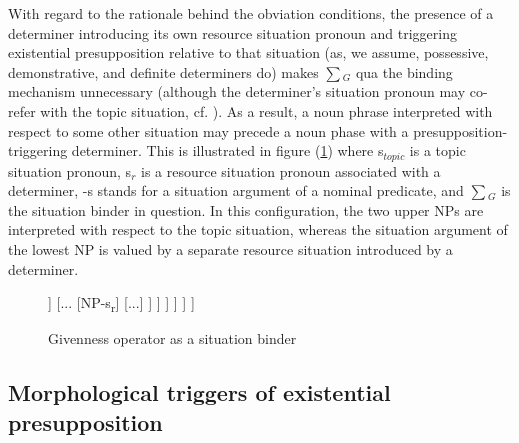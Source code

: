 \documentclass[output=paper,modfonts,nonflat]{langsci/langscibook}
\begin{document}
With regard to the rationale behind the obviation conditions, the presence of a determiner introducing its own resource situation pronoun and triggering existential presupposition relative to that situation (as, we assume, possessive, demonstrative, and definite determiners do) makes $\sum$$_{G}$ qua the binding mechanism unnecessary (although the determiner's situation pronoun may co-refer with the topic situation, cf. \citet{Schwarz:2009}). As a result, a noun phrase interpreted with respect to some other situation may precede a noun phase with a presupposition-triggering determiner. This is illustrated in figure (\ref{fig:tree2}) where s$_{topic}$ is a topic situation pronoun, s$_{r}$ is a resource situation pronoun associated with a determiner, -s stands for a situation argument of a nominal predicate, and $\sum$$_{G}$ is the situation binder in question. In this configuration, the two upper NPs are interpreted with respect to the topic situation, whereas the situation argument of the lowest NP is valued by a separate resource situation introduced by a determiner.

\begin{figure}
\begin{forest}
	[...
	[s\textsubscript{topic}] [...
	[Σ\textsubscript{G}] [...
	[NP-s\textsubscript{topic}] [...
	[NP-s\textsubscript{topic}] [...
	[Det [s\textsubscript{r}]] [...
	[NP-s\textsubscript{r}] [...]
	]
	]
	]	
	]
	]
	]
\end{forest}
\caption{Givenness operator as a situation binder}\label{fig:tree2}
\end{figure}



\subsection{Morphological triggers of existential presupposition}
\end{document}
